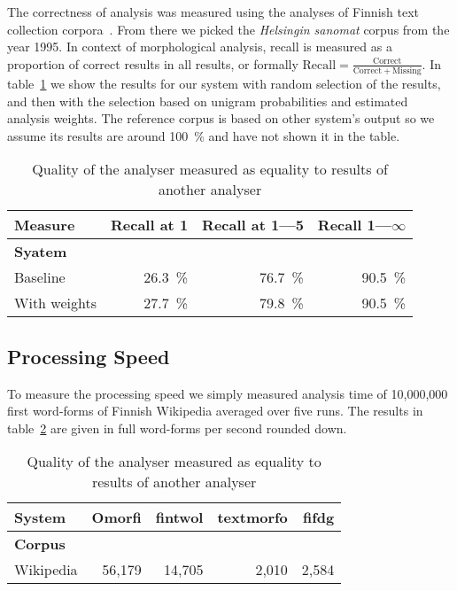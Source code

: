 \documentclass[a4paper,12pt]{article}
\begin{document}
The correctness of analysis was measured using the analyses of Finnish text
collection corpora~\citep{ftc}. From there we picked the \emph{Helsingin
sanomat} corpus from the year 1995. In context of morphological analysis,
recall is measured as a proportion of correct results in all results, or
formally $\mathrm{Recall} = \frac{\mathrm{Correct}}{\mathrm{Correct} +
\mathrm{Missing}}$. In table~\ref{table:quality} we show the results for our
system with random selection of the results, and then with the selection based
on unigram probabilities and estimated analysis weights. The reference corpus
is based on other system's output so we assume its results are around 100~\%
and have not shown it in the table.

\begin{table}
    \centering
    \begin{tabular}{|l|r|r|r|}
        \hline
        \bf Measure & Recall at 1 & Recall at 1---5 & Recall 1---$\infty$  \\
        \hline
        \bf Syatem & & & \\
        \hline
        Baseline & 26.3~\% & 76.7~\% & 90.5~\%\\
        With weights & 27.7~\% & 79.8~\% & 90.5~\%\\
        \hline
    \end{tabular}
    \caption{Quality of the analyser measured as equality to results of
        another analyser \label{table:quality}}
\end{table}

\subsection{Processing Speed}

To measure the processing speed we simply measured analysis time of 10,000,000
first word-forms of Finnish Wikipedia averaged over five runs. The results in
table~\ref{table:speed} are given in full word-forms per second rounded down.

\begin{table}
    \centering
    \begin{tabular}{|l|r|r|r|r|}
        \hline
        \bf System & Omorfi & fintwol & textmorfo & fifdg \\
        \hline
        \bf Corpus &        &         &           & \\
        \hline
        Wikipedia & 56,179  & 14,705  & 2,010 & 2,584 \\
        \hline
    \end{tabular}
    \caption{Quality of the analyser measured as equality to results of
        another analyser \label{table:speed}}
\end{table}
\end{document}
